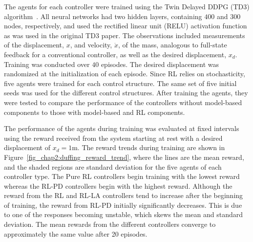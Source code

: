 The agents for each controller were trained using the Twin Delayed DDPG (TD3) algorithm~\cite{Fujimoto:2018a}.
%
All neural networks had two hidden layers, containing $400$ and $300$ nodes, respectively, and used the rectified linear unit (RELU) activation function as was used in the original TD3 paper. The observations included measurements of the displacement, $x$, and velocity, $\dot{x}$, of the mass, analogous to full-state feedback for a conventional controller, as well as the desired displacement, $x_d$.
%
Training was conducted over $40$ episodes.
The desired displacement was randomized at the initialization of each episode.
Since RL relies on stochasticity, five agents were trained for each control structure. The same set of five initial seeds was used for the different control structures.
%
After training the agents, they were tested to compare the performance of the controllers without model-based components to those with model-based and RL components.

%
The performance of the agents during training was evaluated at fixed intervals using the reward received from the system starting at rest with a desired displacement of $x_d=1\si{\meter}$.
The reward trends during training are shown in Figure~\ref{fig_chap2:duffing_reward_trend}, where the lines are the mean reward, and the shaded regions are standard deviation for the five agents of each controller type. The Pure RL controllers begin training with the lowest reward whereas the RL-PD controllers begin with the highest reward. Although the reward from the RL and RL-LA controllers tend to increase after the beginning of training, the reward from RL-PD initially significantly decreases. This is due to one of the responses becoming unstable, which skews the mean and standard deviation. The mean rewards from the different controllers converge to approximately the same value after 20 episodes.
%

